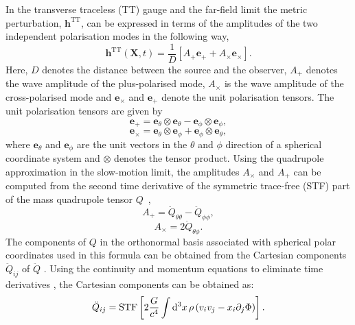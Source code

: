 In the transverse traceless (TT) gauge and the far-field limit the metric perturbation, $\mathbf{h^\mathrm{TT}}$, 
can be expressed in terms of the amplitudes of the two independent polarisation modes in the following way,
\begin{equation}
\mathbf{h}^\mathrm{TT}(\mathbf{X},t) = \frac{1}{D}   \left [ A_{+} \mathbf{e}_{+} + A_{\times} \mathbf{e}_{\times} \right ].
\end{equation}
Here, $D$ denotes the distance between the source and the observer, $A_+$ denotes the wave amplitude of the plus-polarised mode, $A_\times$ is the wave amplitude of the cross-polarised mode and
$\mathbf{e}_{\times}$ and $\mathbf{e}_{+}$ denote the unit polarisation tensors. The unit polarisation tensors are given by
\begin{equation}
\mathbf{e}_{+}  = \mathbf{e}_{\theta} \otimes \mathbf{e}_{\theta} - \mathbf{e}_{\phi} \otimes \mathbf{e}_{\phi},
\end{equation}
\begin{equation}
\mathbf{e_{\times}} = \mathbf{e}_{\theta} \otimes \mathbf{e}_{\phi} + \mathbf{e}_{\phi} \otimes \mathbf{e}_{\theta},
\end{equation}
where $\mathbf{e}_{\theta}$ and $\mathbf{e}_{\phi}$ are the unit vectors in the $\theta$ and $\phi$
direction of a spherical coordinate system and $\otimes$ denotes the tensor product.
Using the quadrupole approximation in the slow-motion limit, the amplitudes $A_{\times}$ and $A_{+}$ can be computed from the second time derivative 
of the symmetric trace-free (STF) part of the mass quadrupole tensor $Q$~\citep{oohara_97},
\begin{equation}
\label{eq:aplus}
A_{+} = \ddot{Q}_{\theta \theta} - \ddot{Q}_{\phi \phi},
\end{equation}
\begin{equation}
\label{eq:ax}
A_{\times} =2 \ddot{Q}_{\theta \phi}.
\end{equation}
The components of $Q$ in the orthonormal basis associated with
spherical polar coordinates used in this formula can be obtained from
the Cartesian components $\ddot{Q}_{ij}$ of $\ddot{Q}$ \citep{oohara_97,nakamura_87}.  Using the
continuity and momentum equations to eliminate time derivatives
\citep{oohara_97,finn_89,blanchet_90}, the Cartesian components can be obtained as:
\begin{equation} \label{eq:STFQ}
\ddot{Q}_{ij} =\mathrm{STF} \left [2 \frac{G}{c^4} \int \mathrm{d}^3 x \, \rho \left ( v_i v_j - x_i \partial_j \Phi \right ) \right].
\end{equation}
